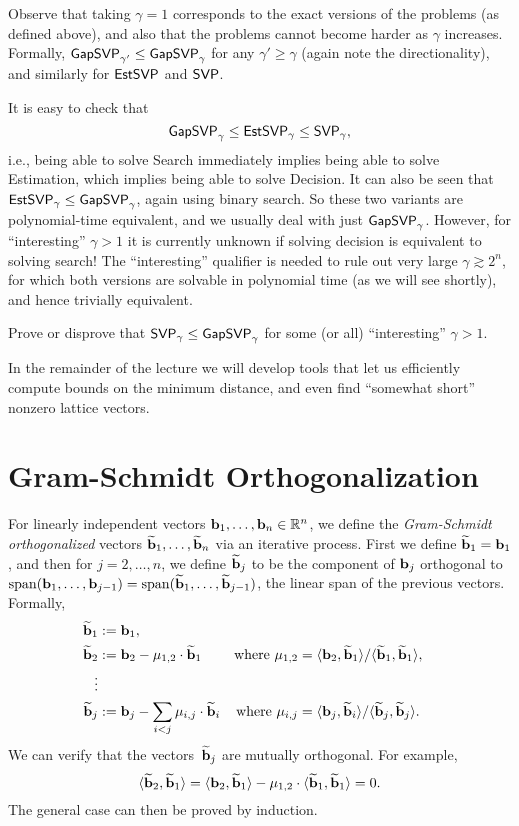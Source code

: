 \documentclass[11pt]{article}
\begin{document}
Observe that taking $\gamma=1$ corresponds to the exact versions of
the problems (as defined above), and also that the problems cannot
become harder as $\gamma$ increases. Formally,
$\mathsf{GapSVP}_{\gamma'} \leq \mathsf{GapSVP}_{\gamma}$ for any
$\gamma' \geq \gamma$ (again note the directionality), and similarly
for $\mathsf{EstSVP}$ and $\mathsf{SVP}$.

It is easy to check that
\[ \mathsf{GapSVP}_{\gamma} \leq \mathsf{EstSVP}_{\gamma} \leq \mathsf{SVP}_{\gamma}, \] i.e.,
being able to solve Search immediately implies being able to solve
Estimation, which implies being able to solve Decision. It can also be
seen that $\mathsf{EstSVP}_{\gamma} \leq \mathsf{GapSVP}_{\gamma}$, again using binary
search. So these two variants are polynomial-time equivalent, and we
usually deal with just $\mathsf{GapSVP}_{\gamma}$. However, for
``interesting'' $\gamma > 1$ it is currently unknown if solving
decision is equivalent to solving search! The ``interesting''
qualifier is needed to rule out very large $\gamma \gtrsim 2^{n}$, for
which both versions are solvable in polynomial time (as we will see
shortly), and hence trivially equivalent.

\begin{openproblem}
  \label{open:svp-search-decision}
  Prove or disprove that $\mathsf{SVP}_{\gamma} \leq \mathsf{GapSVP}_{\gamma}$ for
  some (or all) ``interesting'' $\gamma > 1$.
\end{openproblem}

In the remainder of the lecture we will develop tools that let us
efficiently compute bounds on the minimum distance, and even find
``somewhat short'' nonzero lattice vectors.

\section{Gram-Schmidt Orthogonalization}

For linearly independent vectors $\mathbf{b}_1, \ldots, \mathbf{b}_n \in \mathbb{R}^n$,
we define the \emph{Gram-Schmidt orthogonalized} vectors
$\widetilde{\mathbf{b}}_1, \ldots, \widetilde{\mathbf{b}}_n$ via an iterative process. First
we define $\widetilde{\mathbf{b}}_{1} = \mathbf{b}_{1}$, and then for $j=2,\ldots,n$,
we define $\widetilde{\mathbf{b}}_{j}$ to be the component of $\mathbf{b}_{j}$
orthogonal to
$\operatorname{span}(\mathbf{b}_{1}, \ldots, \mathbf{b}_{j-1}) = \operatorname{span}(\widetilde{\mathbf{b}}_{1}, \ldots,
\widetilde{\mathbf{b}}_{j-1})$, the linear span of the previous vectors.
Formally,
\begin{align*}
  \widetilde{\mathbf{b}}_1 &:= \mathbf{b}_1, \\
  \widetilde{\mathbf{b}}_2 &:= \mathbf{b}_2 - \mu_{1,2} \cdot \widetilde{\mathbf{b}}_1
               & \text{where } \mu_{1,2}
               &= \langle\mathbf{b}_2,\widetilde{\mathbf{b}}_1\rangle/\langle\widetilde{\mathbf{b}}_1,\widetilde{\mathbf{b}}_1\rangle, \\
  \vdots \\
  \widetilde{\mathbf{b}}_j &:= \mathbf{b}_j - \sum_{i < j} \mu_{i,j} \cdot \widetilde{\mathbf{b}}_i
               & \text{where } \mu_{i,j}
               &= \langle\mathbf{b}_j,\widetilde{\mathbf{b}}_i\rangle/\langle\widetilde{\mathbf{b}}_j,\widetilde{\mathbf{b}}_j\rangle.
\end{align*}
We can verify that the vectors~$\widetilde{\mathbf{b}}_{j}$ are mutually
orthogonal. For example,
\[ \langle\widetilde{\mathbf{b}}_{2}, \widetilde{\mathbf{b}}_{1}\rangle = \langle\mathbf{b}_{2},
    \widetilde{\mathbf{b}}_{1}\rangle - \mu_{1,2} \cdot \langle\widetilde{\mathbf{b}}_{1},
    \widetilde{\mathbf{b}}_{1}\rangle = 0. \] The general case can then be proved by
induction.
\end{document}
